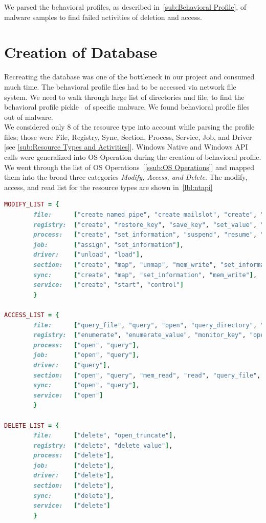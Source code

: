 We parsed the behavioral profiles, as described in~\autoref{sub:Behavioral Profile}, of malware samples to find failed activities of deletion and access.
\section{Creation of Database}
\label{sec:Creation of Database}
Recreating the database was one of the bottleneck in our project and consumed much time.
The behavioral profile files had to be accessed via network file system.
We need to walk through large list of directories and file, to find the behavioral profile pickle~\cite[]{pythonpickle} of specific malware.
We found \emph{\gettotalmalwareii{}} behavioral profile files out of \emph{\gettotalmalwarei{}} malware.\\

We considered only 8 of the resource type into account while parsing the profile files; those were File, Registry, Sync, Section, Process, Service, Job, and Driver [see \autoref{sub:Resource Types and Activities}].
Windows Native and Windows API calls were generalized into OS Operation during the creation of behavioral profile.
We went through the list of OS Operations~[\autoref{ssub:OS Operations}] and mapped them into the broad three categories \emph{Modify, Access, and Delete}.
The modify, access, and read list for the resource types \emph{\getresourcetypes{}} are shown in~\autoref{lbl:ntapi}

\begin{lstlisting}[numbers=none,language=ruby,caption={Mapping of generalized OS Operation from behavioral profile},label={lbl:ntapi}]
MODIFY_LIST = {
        file:      ["create_named_pipe", "create_mailslot", "create", "rename", "set_information", "write", "flush_buffer", "map"],
        registry:  ["create", "restore_key", "save_key", "set_value", "set_information", "mem_write"],
        process:   ["create", "set_information", "suspend", "resume", "unmap", "map"],
        job:       ["assign", "set_information"],
        driver:    ["unload", "load"],
        section:   ["create", "map", "unmap", "mem_write", "set_information"],
        sync:      ["create", "map", "set_information", "mem_write"],
        service:   ["create", "start", "control"]
        }

ACCESS_LIST = {
        file:      ["query_file", "query", "open", "query_directory", "query_information", "read", "monitor_dir", "query_value"],
        registry:  ["enumerate", "enumerate_value", "monitor_key", "open", "query", "query_value", "mem_read"],
        process:   ["open", "query"],
        job:       ["open", "query"],
        driver:    ["query"],
        section:   ["open", "query", "mem_read", "read", "query_file", "query_system"],
        sync:      ["open", "query"],
        service:   ["open"]
        }

DELETE_LIST = {
        file:      ["delete", "open_truncate"],
        registry:  ["delete", "delete_value"],
        process:   ["delete"],
        job:       ["delete"],
        driver:    ["delete"],
        section:   ["delete"],
        sync:      ["delete"],
        service:   ["delete"]
        }

\end{lstlisting}


